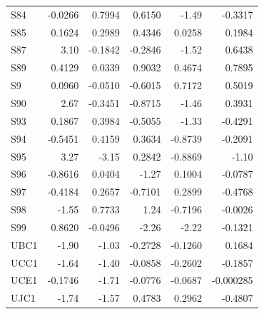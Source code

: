 \begin{longtable}{lrrrrr}
  S84 & -0.0266 & 0.7994 & 0.6150 & -1.49 & -0.3317 \\
  S85 & 0.1624 & 0.2989 & 0.4346 & 0.0258 & 0.1984 \\
  S87 & 3.10 & -0.1842 & -0.2846 & -1.52 & 0.6438 \\
  S89 & 0.4129 & 0.0339 & 0.9032 & 0.4674 & 0.7895 \\
  S9 & 0.0960 & -0.0510 & -0.6015 & 0.7172 & 0.5019 \\
  S90 & 2.67 & -0.3451 & -0.8715 & -1.46 & 0.3931 \\
  S93 & 0.1867 & 0.3984 & -0.5055 & -1.33 & -0.4291 \\
  S94 & -0.5451 & 0.4159 & 0.3634 & -0.8739 & -0.2091 \\
  S95 & 3.27 & -3.15 & 0.2842 & -0.8869 & -1.10 \\
  S96 & -0.8616 & 0.0404 & -1.27 & 0.1004 & -0.0787 \\
  S97 & -0.4184 & 0.2657 & -0.7101 & 0.2899 & -0.4768 \\
  S98 & -1.55 & 0.7733 & 1.24 & -0.7196 & -0.0026 \\
  S99 & 0.8620 & -0.0496 & -2.26 & -2.22 & -0.1321 \\
  UBC1 & -1.90 & -1.03 & -0.2728 & -0.1260 & 0.1684 \\
  UCC1 & -1.64 & -1.40 & -0.0858 & -0.2602 & -0.1857 \\
  UCE1 & -0.1746 & -1.71 & -0.0776 & -0.0687 & -0.000285 \\
  UJC1 & -1.74 & -1.57 & 0.4783 & 0.2962 & -0.4807 \\
\end{longtable}
